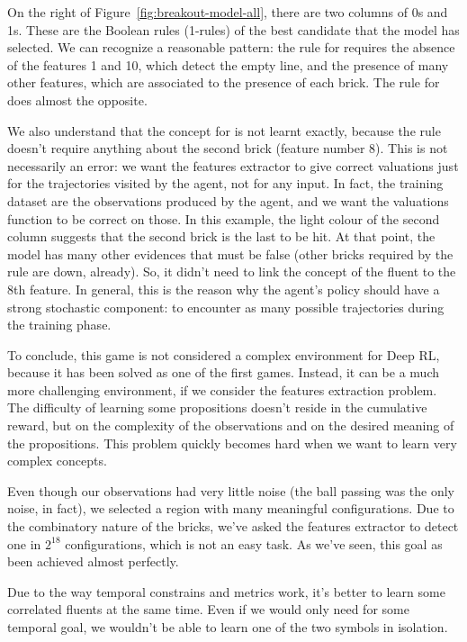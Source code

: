 On the right of Figure~\ref{fig:breakout-model-all}, there are two columns of
0s and 1s.  These are the Boolean rules (1-rules) of the best candidate that
the model has selected. We can recognize a reasonable pattern: the rule for
 requires the absence of the features 1 and 10, which detect the
empty line, and the presence of many other features, which are associated to
the presence of each brick. The rule for  does almost the
opposite.

We also understand that the concept for  is not learnt exactly,
because the rule doesn't require anything about the second brick (feature
number 8). This is not necessarily an error: we want the features extractor to
give correct valuations just for the trajectories visited by the agent, not
for any input. In fact, the training dataset are the observations produced by
the agent, and we want the valuations function to be correct on those. In this
example, the light colour of the second column suggests that the second brick
is the last to be hit. At that point, the model has many other evidences that
 must be false (other bricks required by the rule are down,
already). So, it didn't need to link the concept of the fluent to the 8th
feature. In general, this is the reason why the agent's policy should have a
strong stochastic component: to encounter as many possible trajectories during
the training phase.

To conclude, this game is not considered a complex environment for Deep RL,
because it has been solved as one of the first games. Instead, it can be a
much more challenging environment, if we consider the features extraction
problem. The difficulty of learning some propositions doesn't reside in the
cumulative reward, but on the complexity of the observations and on the
desired meaning of the propositions. This problem quickly becomes hard when
we want to learn very complex concepts.

Even though our observations had very little noise (the ball passing was the
only noise, in fact), we selected a region with many meaningful
configurations. Due to the combinatory nature of the bricks, we've asked the
features extractor to detect one in $2^{18}$ configurations, which is not an
easy task. As we've seen, this goal as been achieved almost perfectly.

Due to the way temporal constrains and metrics work, it's better to learn some
correlated fluents at the same time. Even if we would only need 
for some temporal goal, we wouldn't be able to learn one of the two symbols in
isolation.

